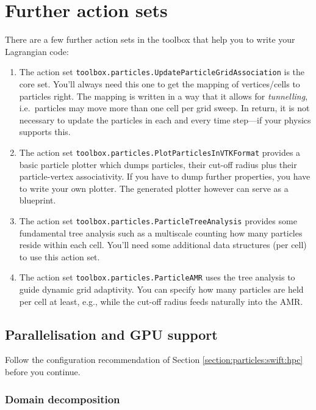 \section{Further action sets}

There are a few further action sets in the toolbox that help you to write your
Lagrangian code:


\begin{enumerate}
  \item The action set \texttt{toolbox.particles.UpdateParticleGridAssociation}
  is the core set. You'll always need this one to get the mapping of
  vertices/cells to particles right. The mapping is written in a way that it
  allows for \emph{tunnelling}, i.e.~particles may move more than one cell per
  grid sweep. In return, it is not necessary to update the particles in each and
  every time step---if your physics supports this.
  \item The action set \texttt{toolbox.particles.PlotParticlesInVTKFormat}
  provides a basic particle plotter which dumps particles, their cut-off radius
  plus their particle-vertex associativity. If you have to dump further
  properties, you have to write your own plotter. The generated plotter however
  can serve as a blueprint.
  \item The action set \texttt{toolbox.particles.ParticleTreeAnalysis} provides
  some fundamental tree analysis such as a multiscale counting how many
  particles reside within each cell. You'll need some additional data structures
  (per cell) to use this action set.
  \item The action set \texttt{toolbox.particles.ParticleAMR} uses the tree
  analysis to guide dynamic grid adaptivity. You can specify how many particles
  are held per cell at least, e.g., while the cut-off radius feeds naturally
  into the AMR.
\end{enumerate}



\subsection{Parallelisation and GPU support}

Follow the configuration recommendation of Section
\ref{section:particles:swift:hpc} before you continue.

\subsubsection{Domain decomposition}

